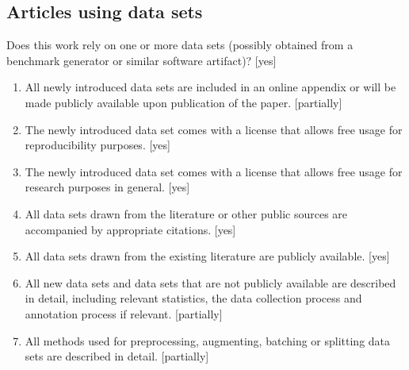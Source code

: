 \documentclass[manuscript,screen,review]{jair}
\begin{document}
\subsection*{Articles using data sets}
Does this work rely on one or more data sets (possibly obtained from a benchmark generator or similar software artifact)? [yes]
\begin{enumerate}[leftmargin=*]
  \item All newly introduced data sets are included in an online appendix or will be made publicly available upon publication of the paper. [partially]
  \item The newly introduced data set comes with a license that allows free usage for reproducibility purposes. [yes]
  \item The newly introduced data set comes with a license that allows free usage for research purposes in general. [yes]
  \item All data sets drawn from the literature or other public sources are accompanied by appropriate citations. [yes]
  \item All data sets drawn from the existing literature are publicly available. [yes]
  \item All new data sets and data sets that are not publicly available are described in detail, including relevant statistics, the data collection process and annotation process if relevant. [partially]
  \item All methods used for preprocessing, augmenting, batching or splitting data sets are described in detail. [partially]
\end{enumerate}
\end{document}

